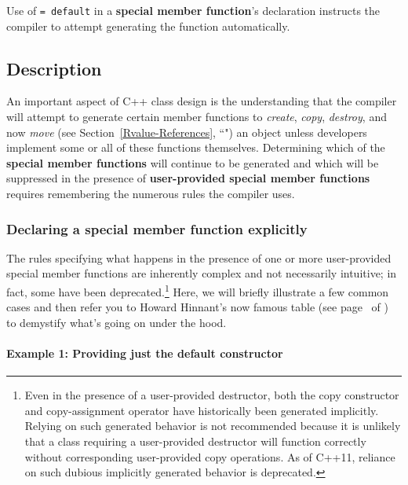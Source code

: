 


Use of \texttt{=}~\texttt{default} in a \textbf{special member function}'s
declaration instructs the compiler to attempt generating the function
automatically.

\subsection[Description]{Description}\label{description}

An important aspect of C++ class design is the understanding that the
compiler will attempt to generate certain member functions to
\emph{create}, \emph{copy}, \emph{destroy}, and now
\emph{move} (see Section~\ref{Rvalue-References}, ``") an object unless
developers implement some or all of these functions
themselves. Determining which of the \textbf{special member functions}
will continue to be generated and which will be suppressed in the
presence of \textbf{user-provided special member functions}
requires remembering the numerous rules the compiler uses.

\subsubsection[Declaring a special member function explicitly]{Declaring a special member function explicitly}\label{declaring-a-special-member-function-explicitly}

The rules specifying what happens in the presence of one or more
user-provided special member functions are inherently complex and not
necessarily intuitive; in fact, some have been
deprecated.{\cprotect\footnote{Even in the presence of a user-provided
destructor, both the copy constructor and copy-assignment operator
have historically been generated implicitly. Relying on such generated
behavior is not recommended because it is unlikely that a class
requiring a user-provided destructor will function correctly without
corresponding user-provided copy operations. As of C++11, reliance on
  such dubious implicitly generated behavior is deprecated.}} Here, we
will briefly illustrate a few common cases and then refer you to Howard
Hinnant's now famous table (see page~\pageref{default-table1} of {\it{}}) to
demystify what's going on under the hood.

\paragraph[Example 1: Providing just the default constructor]{Example 1: Providing just the default constructor}\label{example-1:-providing-just-the-default-constructor}

